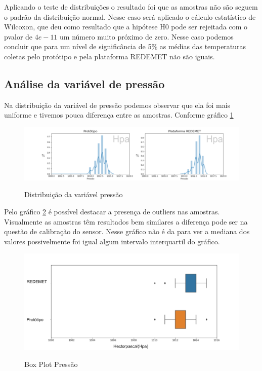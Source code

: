 \setlength\parindent{2em}
Aplicando o teste de distribuições o resultado foi que as amostras não são seguem o padrão da distribuição normal. Nesse caso será aplicado o cálculo estatístico de Wilcoxon, que deu como resultado que a hipótese H0 pode ser rejeitada com o pvalor de $4e-11$ um número muito próximo de zero. Nesse caso podemos concluir que para um nível de significância de 5\% as médias das temperaturas coletas pelo protótipo e pela plataforma REDEMET não são iguais.


\subsection{Análise da variável de pressão}

Na distribuição da variável de pressão podemos observar que ela foi mais uniforme e tivemos pouca diferença entre as amostras. Conforme gráfico \ref{fig:dist_pressao}

\begin{figure} [!h]
    \centering
    \caption{Distribuição da variável pressão}    
    \includegraphics [scale = 0.5] {Figuras/dist_pressao.png}
    \label{fig:dist_pressao}
\end{figure}

Pelo gráfico \ref{fig:box_plot_pressao} é possível destacar a presença de outliers nas amostras. Visualmente as amostras têm resultados bem similares a diferença pode ser na questão de calibração do sensor. Nesse gráfico não é da para ver a mediana dos valores possivelmente foi igual algum intervalo interquartil do gráfico.

\begin{figure} [!h]
    \centering
    \caption{Box Plot Pressão}    
    \includegraphics [scale = 0.45] {Figuras/box_plot_pressao.png}
    \label{fig:box_plot_pressao}
\end{figure}

